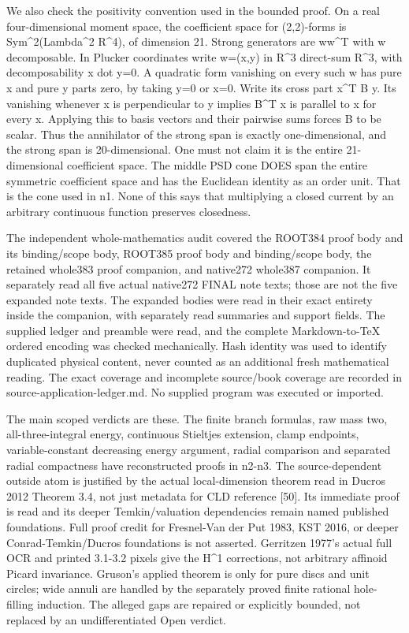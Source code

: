 \documentclass[11pt]{article}
\begin{document}
We also check the positivity convention used in the bounded proof. On a real four-dimensional moment space, the coefficient space for (2,2)-forms is Sym\textasciicircum{}2(Lambda\textasciicircum{}2 R\textasciicircum{}4), of dimension 21. Strong generators are ww\textasciicircum{}T with w decomposable. In Plucker coordinates write w=(x,y) in R\textasciicircum{}3 direct-sum R\textasciicircum{}3, with decomposability x dot y=0. A quadratic form vanishing on every such w has pure x and pure y parts zero, by taking y=0 or x=0. Write its cross part x\textasciicircum{}T B y. Its vanishing whenever x is perpendicular to y implies B\textasciicircum{}T x is parallel to x for every x. Applying this to basis vectors and their pairwise sums forces B to be scalar. Thus the annihilator of the strong span is exactly one-dimensional, and the strong span is 20-dimensional. One must not claim it is the entire 21-dimensional coefficient space. The middle PSD cone DOES span the entire symmetric coefficient space and has the Euclidean identity as an order unit. That is the cone used in n1. None of this says that multiplying a closed current by an arbitrary continuous function preserves closedness.

The independent whole-mathematics audit covered the ROOT384 proof body and its binding/scope body, ROOT385 proof body and binding/scope body, the retained whole383 proof companion, and native272 whole387 companion. It separately read all five actual native272 FINAL note texts; those are not the five expanded note texts. The expanded bodies were read in their exact entirety inside the companion, with separately read summaries and support fields. The supplied ledger and preamble were read, and the complete Markdown-to-TeX ordered encoding was checked mechanically. Hash identity was used to identify duplicated physical content, never counted as an additional fresh mathematical reading. The exact coverage and incomplete source/book coverage are recorded in source-application-ledger.md. No supplied program was executed or imported.

The main scoped verdicts are these. The finite branch formulas, raw mass two, all-three-integral energy, continuous Stieltjes extension, clamp endpoints, variable-constant decreasing energy argument, radial comparison and separated radial compactness have reconstructed proofs in n2-n3. The source-dependent outside atom is justified by the actual local-dimension theorem read in Ducros 2012 Theorem 3.4, not just metadata for CLD reference [50]. Its immediate proof is read and its deeper Temkin/valuation dependencies remain named published foundations. Full proof credit for Fresnel-Van der Put 1983, KST 2016, or deeper Conrad-Temkin/Ducros foundations is not asserted. Gerritzen 1977's actual full OCR and printed 3.1-3.2 pixels give the H\textasciicircum{}1 corrections, not arbitrary affinoid Picard invariance. Gruson's applied theorem is only for pure discs and unit circles; wide annuli are handled by the separately proved finite rational hole-filling induction. The alleged gaps are repaired or explicitly bounded, not replaced by an undifferentiated Open verdict.
\end{document}
